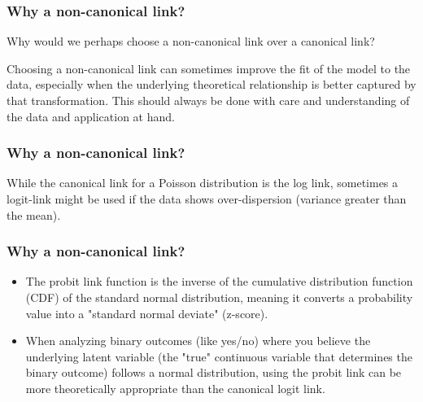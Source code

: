 \documentclass{beamer}
\begin{document}
\begin{frame}
\frametitle{Why a non-canonical link?}

Why would we perhaps choose a non-canonical link over a canonical link? 

\vspace*{1em}

Choosing a non-canonical link can sometimes improve the fit of the model to the data, especially when the underlying theoretical relationship is better captured by that transformation. This should always be done with care and understanding of the data and application at hand. 

\end{frame}

\begin{frame}
\frametitle{Why a non-canonical link?}

While the canonical link for a Poisson distribution is the log link, sometimes a logit-link might be used if the data shows over-dispersion (variance greater than the mean).

\end{frame}

\begin{frame}
\frametitle{Why a non-canonical link?}


\begin{itemize}
\item The probit link function is the inverse of the cumulative distribution function (CDF) of the standard normal distribution, meaning it converts a probability value into a "standard normal deviate" (z-score). 
\item When analyzing binary outcomes (like yes/no) where you believe the underlying latent variable (the "true" continuous variable that determines the binary outcome) follows a normal distribution, using the probit link can be more theoretically appropriate than the canonical logit link. 
\end{itemize}




\end{frame}
\end{document}
